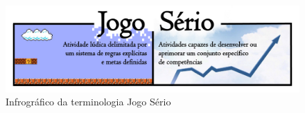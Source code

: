 



\pagebreak

\begin{figure}[htb]

	\caption{\label{fig:JS}Infrográfico da terminologia Jogo Sério}\vspace{-0,5cm}
  \begin{center}
    \includegraphics[width=\linewidth]{./Figuras/JogoSerio.pdf}
	\end{center} \vspace{-0,9cm}

\end{figure}

